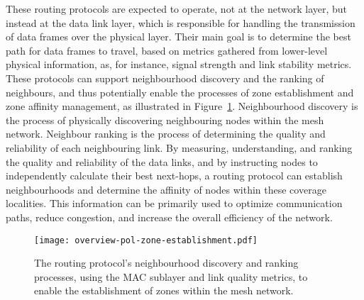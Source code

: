 These routing protocols are expected to operate, not at the network layer, but instead at the data link layer, which is responsible for handling the transmission of data frames over the physical layer. Their main goal is to determine the best path for data frames to travel, based on metrics gathered from lower-level physical information, as, for instance, signal strength and link stability metrics. These protocols can support neighbourhood discovery and the ranking of neighbours, and thus potentially enable the processes of zone establishment and zone affinity management, as illustrated in Figure~\ref{fig:proof-of-location-overview-pol-zone-establishment}. Neighbourhood discovery is the process of physically discovering neighbouring nodes within the mesh network. Neighbour ranking is the process of determining the quality and reliability of each neighbouring link. By measuring, understanding, and ranking the quality and reliability of the data links, and by instructing nodes to independently calculate their best next-hops, a routing protocol can establish neighbourhoods and determine the affinity of nodes within these coverage localities. This information can be primarily used to optimize communication paths, reduce congestion, and increase the overall efficiency of the network.

\begin{figure}[h!]
    \begin{center}
    \texttt{[image: overview-pol-zone-establishment.pdf]}
    \caption{The routing protocol's neighbourhood discovery and ranking processes, using the MAC sublayer and link quality metrics, to enable the establishment of zones within the mesh network.}
    \label{fig:proof-of-location-overview-pol-zone-establishment}
    \end{center}
\end{figure}

